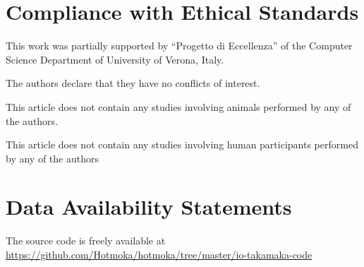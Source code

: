 \section{Compliance with Ethical Standards}

This work was partially supported by ``Progetto di Eccellenza''
of the Computer Science Department of University of Verona, Italy.

The authors declare that they have no conflicts of interest.

This article does not contain any studies involving animals performed by any of the authors.

This article does not contain any studies involving human participants performed by any of the authors

\section{Data Availability Statements}

The source code is freely available at \url{https://github.com/Hotmoka/hotmoka/tree/master/io-takamaka-code}
